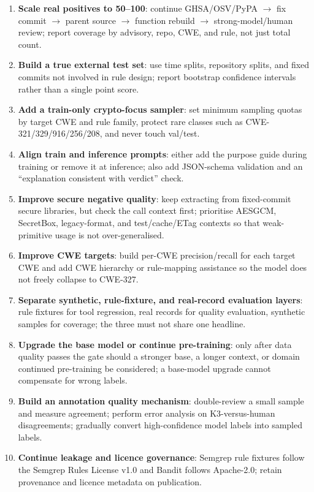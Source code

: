 \documentclass[11pt]{article}
\begin{document}
\begin{enumerate}
  \item \textbf{Scale real positives to 50--100}: continue GHSA/OSV/PyPA $\rightarrow$ fix commit $\rightarrow$
        parent source $\rightarrow$ function rebuild $\rightarrow$ strong-model/human review; report coverage
        by advisory, repo, CWE, and rule, not just total count.
  \item \textbf{Build a true external test set}: use time splits, repository splits, and fixed commits not
        involved in rule design; report bootstrap confidence intervals rather than a single point score.
  \item \textbf{Add a train-only crypto-focus sampler}: set minimum sampling quotas by target CWE and rule
        family, protect rare classes such as CWE-321/329/916/256/208, and never touch val/test.
  \item \textbf{Align train and inference prompts}: either add the purpose guide during training or remove it
        at inference; also add JSON-schema validation and an ``explanation consistent with verdict'' check.
  \item \textbf{Improve secure negative quality}: keep extracting from fixed-commit secure libraries, but
        check the call context first; prioritise AESGCM, SecretBox, legacy-format, and test/cache/ETag
        contexts so that weak-primitive usage is not over-generalised.
  \item \textbf{Improve CWE targets}: build per-CWE precision/recall for each target CWE and add CWE hierarchy
        or rule-mapping assistance so the model does not freely collapse to CWE-327.
  \item \textbf{Separate synthetic, rule-fixture, and real-record evaluation layers}: rule fixtures for tool
        regression, real records for quality evaluation, synthetic samples for coverage; the three must not
        share one headline.
  \item \textbf{Upgrade the base model or continue pre-training}: only after data quality passes the gate
        should a stronger base, a longer context, or domain continued pre-training be considered; a base-model
        upgrade cannot compensate for wrong labels.
  \item \textbf{Build an annotation quality mechanism}: double-review a small sample and measure agreement;
        perform error analysis on K3-versus-human disagreements; gradually convert high-confidence model
        labels into sampled labels.
  \item \textbf{Continue leakage and licence governance}: Semgrep rule fixtures follow the Semgrep Rules
        License v1.0 and Bandit follows Apache-2.0; retain provenance and licence metadata on publication.
\end{enumerate}
\end{document}
